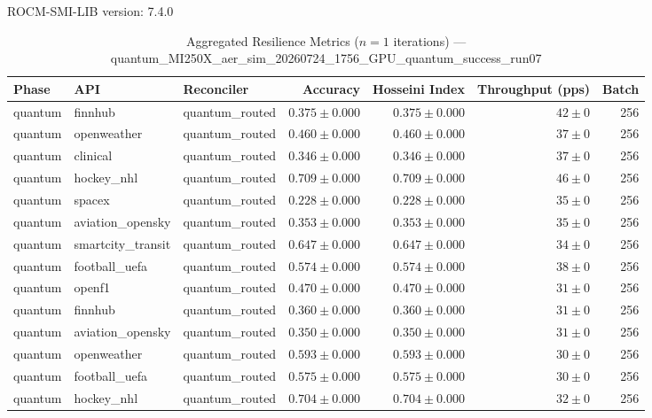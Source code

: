 ROCM-SMI-LIB version: 7.4.0

\begin{table}[htbp]
\caption{Aggregated Resilience Metrics ($n=1$ iterations) --- quantum_MI250X_aer_sim_20260724_1756_GPU_quantum_success_run07}
\begin{tabular}{l l l r r r r}
\hline
Phase & API & Reconciler & Accuracy & Hosseini Index & Throughput (pps) & Batch \\
\hline
quantum & finnhub & quantum\_routed & $0.375\pm0.000$ & $0.375\pm0.000$ & $42\pm0$ & 256 \\
quantum & openweather & quantum\_routed & $0.460\pm0.000$ & $0.460\pm0.000$ & $37\pm0$ & 256 \\
quantum & clinical & quantum\_routed & $0.346\pm0.000$ & $0.346\pm0.000$ & $37\pm0$ & 256 \\
quantum & hockey\_nhl & quantum\_routed & $0.709\pm0.000$ & $0.709\pm0.000$ & $46\pm0$ & 256 \\
quantum & spacex & quantum\_routed & $0.228\pm0.000$ & $0.228\pm0.000$ & $35\pm0$ & 256 \\
quantum & aviation\_opensky & quantum\_routed & $0.353\pm0.000$ & $0.353\pm0.000$ & $35\pm0$ & 256 \\
quantum & smartcity\_transit & quantum\_routed & $0.647\pm0.000$ & $0.647\pm0.000$ & $34\pm0$ & 256 \\
quantum & football\_uefa & quantum\_routed & $0.574\pm0.000$ & $0.574\pm0.000$ & $38\pm0$ & 256 \\
quantum & openf1 & quantum\_routed & $0.470\pm0.000$ & $0.470\pm0.000$ & $31\pm0$ & 256 \\
quantum & finnhub & quantum\_routed & $0.360\pm0.000$ & $0.360\pm0.000$ & $31\pm0$ & 256 \\
quantum & aviation\_opensky & quantum\_routed & $0.350\pm0.000$ & $0.350\pm0.000$ & $31\pm0$ & 256 \\
quantum & openweather & quantum\_routed & $0.593\pm0.000$ & $0.593\pm0.000$ & $30\pm0$ & 256 \\
quantum & football\_uefa & quantum\_routed & $0.575\pm0.000$ & $0.575\pm0.000$ & $30\pm0$ & 256 \\
quantum & hockey\_nhl & quantum\_routed & $0.704\pm0.000$ & $0.704\pm0.000$ & $32\pm0$ & 256 \\

\end{tabular}
\end{table}
